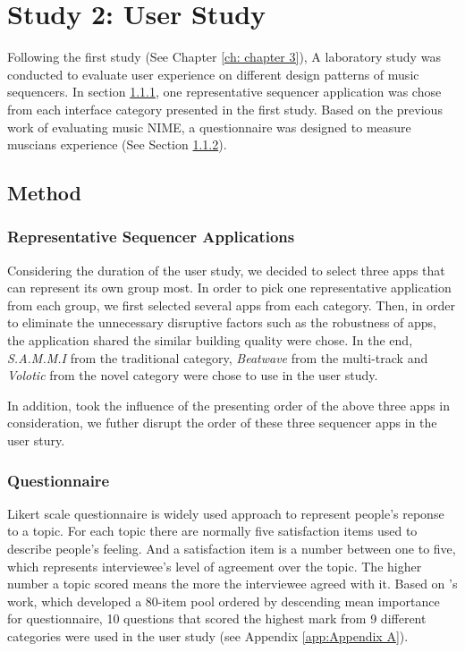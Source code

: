 \pagestyle{fancy}
\rhead{\thepage}
\chapter{Study 2: User Study}
\label{ch: chapter 4}

Following the first study (See Chapter \ref{ch: chapter 3}), A laboratory study was conducted to evaluate user experience on different design patterns of music sequencers. In section \ref{subsec: representative}, one representative sequencer application was chose from each interface category presented in the first study. Based on the previous work of evaluating music NIME, a questionnaire was designed to measure muscians experience (See Section \ref{subsec: questionnaire}).

\section{Method}
\subsection{Representative Sequencer Applications}
\label{subsec: representative}

Considering the duration of the user study, we decided to select three apps that can represent it\textquotesingle s own group most. In order to pick one representative application from each group, we first selected several apps from each category. Then, in order to eliminate the unnecessary disruptive factors such as the robustness of apps, the application shared the similar building quality were chose. In the end, \textit{S.A.M.M.I} from the traditional category, \textit{Beatwave} from the multi-track and \textit{Volotic} from the novel category were chose to use in the user study.

In addition, took the influence of the presenting order of the above three apps in consideration, we futher disrupt the order of these three sequencer apps in the user stury.

\subsection{Questionnaire}
\label{subsec: questionnaire}
Likert scale questionnaire is widely used approach to represent people's reponse to a topic. For each topic there are normally five satisfaction items used to describe people's feeling. And a satisfaction item is a number between one to five, which represents interviewee's level of agreement over the topic. The higher number a topic scored means the more the interviewee agreed with it. Based on \citeauthor{Reference0}'s work, which developed a 80-item pool ordered by descending mean importance for questionnaire, 10 questions that scored the highest mark from 9 different categories were used in the user study (see Appendix \ref{app:Appendix A}).

